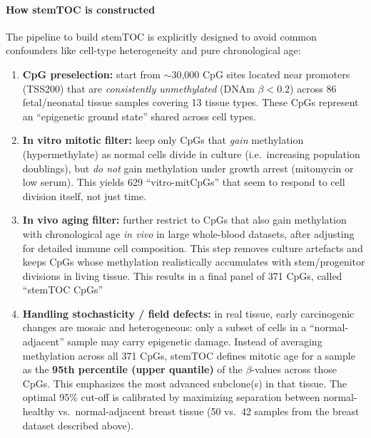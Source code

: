 \documentclass[10pt]{extarticle}
\begin{document}
\paragraph{How stemTOC is constructed}
The pipeline to build stemTOC is explicitly designed to avoid common confounders like cell-type heterogeneity and pure chronological age:
\begin{enumerate}[label=\arabic*)]
  \item \textbf{CpG preselection:} start from $\sim$30{,}000 CpG sites located near promoters (TSS200) that are \textit{consistently unmethylated} (DNAm $\beta<0.2$) across 86 fetal/neonatal tissue samples covering 13 tissue types. These CpGs represent an ``epigenetic ground state'' shared across cell types.
  \item \textbf{In vitro mitotic filter:} keep only CpGs that \textit{gain} methylation (hypermethylate) as normal cells divide in culture (i.e.\ increasing population doublings), but \textit{do not} gain methylation under growth arrest (mitomycin or low serum). This yields 629 ``vitro-mitCpGs'' that seem to respond to cell division itself, not just time.
  \item \textbf{In vivo aging filter:} further restrict to CpGs that also gain methylation with chronological age \textit{in vivo} in large whole-blood datasets, after adjusting for detailed immune cell composition. This step removes culture artefacts and keeps CpGs whose methylation realistically accumulates with stem/progenitor divisions in living tissue. This results in a final panel of 371 CpGs, called ``stemTOC CpGs''
  \item \textbf{Handling stochasticity / field defects:} in real tissue, early carcinogenic changes are mosaic and heterogeneous: only a subset of cells in a ``normal-adjacent'' sample may carry epigenetic damage. Instead of averaging methylation across all 371 CpGs, stemTOC defines mitotic age for a sample as the \textbf{95th percentile (upper quantile)} of the $\beta$-values across those CpGs. This emphasizes the most advanced subclone(s) in that tissue. The optimal 95\% cut-off is calibrated by maximizing separation between normal-healthy vs.\ normal-adjacent breast tissue (50 vs.\ 42 samples from the breast dataset described above).
\end{enumerate}
\end{document}
